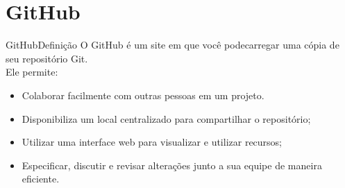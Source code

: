 \documentclass{beamer}
\begin{document}
\section{GitHub}
\begin{frame}{GitHub}{Definição}
  O GitHub é um site em que você podecarregar uma cópia de seu repositório 
Git.\\
Ele permite:
  \begin{itemize}
   \item Colaborar facilmente com outras pessoas em um projeto.
    \item Disponibiliza um local centralizado para compartilhar o 
repositório;
     \item Utilizar uma interface web para visualizar e utilizar recursos;
     \item Especificar, discutir e revisar alterações junto a sua equipe 
de maneira eficiente.
  \end{itemize}

\end{frame}
\end{document}
